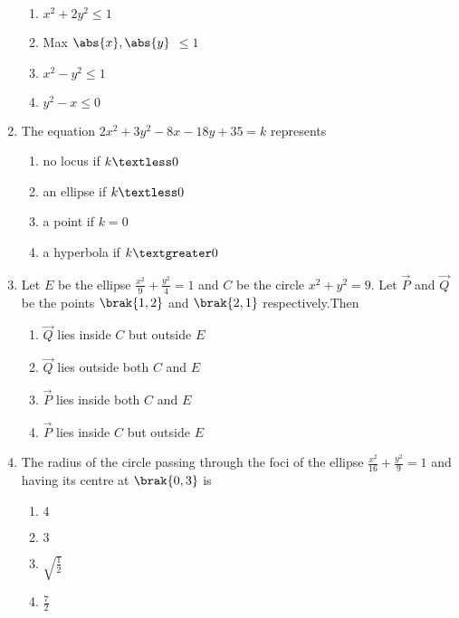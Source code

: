 \begin{enumerate}[label=\thesubsection.\arabic*.,ref=\thesubsection.\theenumi]
         \hfill {}
						\begin{multicols}{2}
\begin{enumerate}
    \item $x^2+2y^2\le1$
    \item Max $\abs{x},\abs{y}$ $\le1$
    \item $x^2-y^2\le1$
    \item $y^2-x\le0$
\end{enumerate}\end{multicols}
\item The equation $2x^2+3y^2-8x-18y+35=k$ represents
        \hfill {}
							\begin{multicols}{2}
\begin{enumerate}
    \item no locus if $k\textless0$
    \item an ellipse if $k\textless0$
    \item a point if $k=0$
    \item a hyperbola if $k\textgreater0$ 
\end{enumerate}\end{multicols}
\item Let $E$ be the ellipse $\frac{x^2}{9}+\frac{y^2}{4}=1$ and $C$ be the circle $x^2+y^2=9$. Let $\vec{P}$ and $\vec{Q}$ be the points $\brak{1,2}$ and $\brak{2,1}$ respectively.Then
        \hfill {}
								\begin{multicols}{2}
\begin{enumerate}
    \item $\vec{Q}$ lies inside $C$ but outside $E$
    \item $\vec{Q}$ lies outside both $C$ and $E$
    \item $\vec{P}$ lies inside both $C$ and $E$
    \item $\vec{P}$ lies inside $C$ but outside $E$ 
\end{enumerate}\end{multicols}
\item The radius of the circle passing through the foci of the ellipse $\frac{x^2}{16}+\frac{y^2}{9}=1$ and having its centre at $\brak{0,3}$ is
       \hfill {}
									\begin{multicols}{4}
\begin{enumerate}
    \item $4$
    \item $3$
    \item $\sqrt{\frac{1}{2}}$
    \item $\frac{7}{2}$

\end{enumerate}
\end{multicols}
\end{enumerate}
